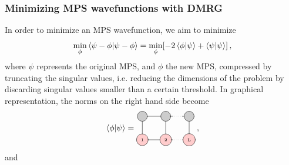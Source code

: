 \documentclass[twoside,twocolumn,9pt]{article}
\begin{document}
\subsubsection{Minimizing MPS wavefunctions with DMRG}
In order to minimize an MPS wavefunction, we aim to minimize
\begin{equation}
  \min_\phi \bra{\psi - \phi}\ket{\psi - \phi} = \min_\phi [-2\bra{\phi}\ket{\psi} + \bra{\psi}\ket{\psi}] \thinspace ,
\end{equation}
where $\psi$ represents the original MPS, and $\phi$ the new MPS, compressed by truncating the singular values, i.e. reducing the dimensions of the problem by discarding singular values smaller than a certain threshold. In graphical representation, the norms on the right hand side become
\begin{equation} 
    \bra{\phi}\ket{\psi} =
  \begin{tikzpicture}[baseline={([yshift=-.5ex]current bounding box.center)}]
    \draw[gray, thick] (0,0) -- (0,-1);
    \draw[gray, thick] (1,0) -- (1,-1);
    \draw[gray, thick] (2,0) -- (2,-1);

    \draw[gray, thick] (0,0) -- (1.3,0);
    \draw[gray, dotted] (1.3,0) -- (1.7,0);
    \draw[gray, thick] (1.7,0) -- (2.0,0);

    \draw[gray, thick] (0,-1) -- (1.3,-1);
    \draw[gray, dotted] (1.3,-1) -- (1.7,-1);
    \draw[gray, thick] (1.7,-1) -- (2.0,-1);

    \node[draw, circle, line cap=round, fill=black!20, minimum size=12] at (0,0) {  };
    \node[draw, circle, line cap=round, fill=black!20, minimum size=12] at (1,0) {  };
    \node[draw, circle, line cap=round, fill=black!20, minimum size=12] at (2,0) {  };

    \node[draw, circle, line cap=round, fill=red!20] at (0,-1) {\tiny 1};
    \node[draw, circle, line cap=round, fill=red!20] at (1,-1) {\tiny 2};
    \node[draw, circle, line cap=round, fill=red!20] at (2,-1) {\tiny L};
  \end{tikzpicture} \thinspace ,
\end{equation}
and
\end{document}
